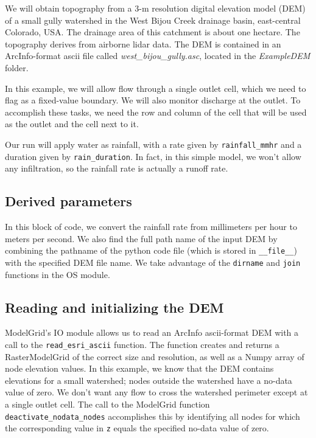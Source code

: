 \documentclass[12pt]{article}
\newcommand{\code}[1]{{\tt #1}}
\begin{document}
We will obtain topography from a 3-m resolution digital elevation model (DEM) of a small gully watershed in the West Bijou Creek drainage basin, east-central Colorado, USA. The drainage area of this catchment is about one hectare. The topography derives from airborne lidar data. The DEM is contained in an ArcInfo-format ascii file called {\em west\_bijou\_gully.asc}, located in the {\em ExampleDEM} folder.

In this example, we will allow flow through a single outlet cell, which we need to flag as a fixed-value boundary. We will also monitor discharge at the outlet. To accomplish these tasks, we need the row and column of the cell that will be used as the outlet and the cell next to it.

Our run will apply water as rainfall, with a rate given by \code{rainfall\_mmhr} and a duration given by \code{rain\_duration}. In fact, in this simple model, we won't allow any infiltration, so the rainfall rate is actually a runoff rate.

\subsection{Derived parameters}



In this block of code, we convert the rainfall rate from millimeters per hour to meters per second. We also find the full path name of the input DEM by combining the pathname of the python code file (which is stored in \code{\_\_file\_\_}) with the specified DEM file name. We take advantage of the \code{dirname} and \code{join} functions in the OS module.

\subsection{Reading and initializing the DEM}



ModelGrid's IO module allows us to read an ArcInfo ascii-format DEM with a call to the \code{read\_esri\_ascii} function. The function creates and returns a RasterModelGrid of the correct size and resolution, as well as a Numpy array of node elevation values. In this example, we know that the DEM contains elevations for a small watershed; nodes outside the watershed have a no-data value of zero. We don't want any flow to cross the watershed perimeter except at a single outlet cell. The call to the ModelGrid function \code{deactivate\_nodata\_nodes} accomplishes this by identifying all nodes for which the corresponding value in \code{z} equals the specified no-data value of zero.
\end{document}
